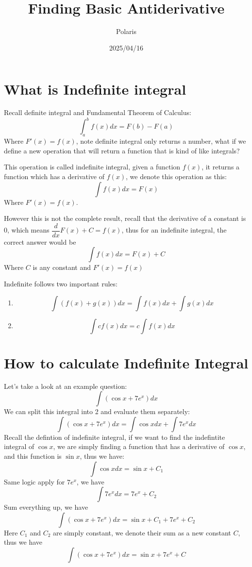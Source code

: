 \documentclass{article}
\title{Finding Basic Antiderivative}
\author{Polaris}
\date{2025/04/16}
\begin{document}
\maketitle

\section{What is Indefinite integral}
Recall definite integral and Fundamental Theorem of Calculus:
\[
\int_{a}^{b}f(x)dx = F(b) - F(a)
\]
Where $F'(x) = f(x)$, note definite integral only returns a number, 
what if we define a new operation that will return a function that is kind of like integrals?

This operation is called indefinite integral, given a function $f(x)$, it returns a function which 
has a derivative of $f(x)$, we denote this operation as this:
\[
\int f(x)dx = F(x)
\]
Where $F'(x) = f(x)$.

However this is not the complete result, recall that the derivative of a constant is 0,
which means $\displaystyle \dfrac{d}{dx}F(x)+C = f(x)$, thus for an indefinite integral, the correct answer would be
\[
\int f(x)dx = F(x)+C
\]
Where $C$ is any constant and $F'(x) = f(x)$

Indefinite follows two important rules:
\begin{enumerate}
    \item \[
    \int (f(x) + g(x)) dx = \int f(x) dx + \int g(x) dx
    \]
    \item \[
    \int cf(x) dx = c\int f(x)dx
    \]
\end{enumerate}

\newpage
\section{How to calculate Indefinite Integral}
Let's take a look at an example question:
\[
\int (\cos x + 7e^x)dx
\]
We can split this integral into 2 and evaluate them separately:
\[
    \int (\cos x + 7e^x)dx = \int \cos x dx + \int 7e^x dx
\]
Recall the defintion of indefinite integral, if we want to find the indefintite integral of
$\cos x$, we are simply finding a function that has a derivative of $\cos x$, and this function is $\sin x$, thus we have:
\[
\int \cos x dx = \sin x +C_1
\]
Same logic apply for $7e^x$, we have
\[
\int 7e^x dx = 7e^x +C_2
\]
Sum everything up, we have
\[
    \int (\cos x + 7e^x)dx = \sin x + C_1 + 7e^x +C_2
\]
Here $C_1$ and $C_2$ are simply constant, we denote their sum as a new constant $C$, thus we have
\[
    \int (\cos x + 7e^x)dx = \sin x + 7e^x +C
\]
\end{document}
